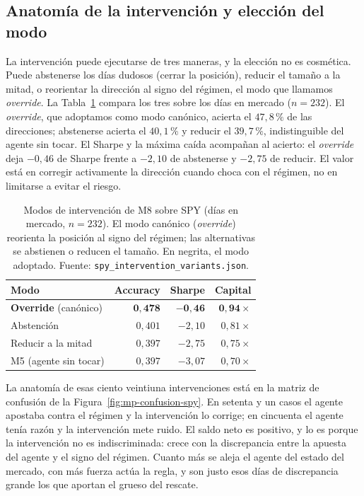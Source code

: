 \subsection{Anatomía de la intervención y elección del modo}
\label{sec:mp-spy-variantes}

La intervención puede ejecutarse de tres maneras, y la elección no es cosmética. Puede abstenerse los días dudosos (cerrar la posición), reducir el tamaño a la mitad, o reorientar la dirección al signo del régimen, el modo que llamamos \emph{override}. La Tabla~\ref{tab:mp-variantes} compara los tres sobre los días en mercado ($n = 232$). El \emph{override}, que adoptamos como modo canónico, acierta el $47{,}8\,\%$ de las direcciones; abstenerse acierta el $40{,}1\,\%$ y reducir el $39{,}7\,\%$, indistinguible del agente sin tocar. El Sharpe y la máxima caída acompañan al acierto: el \emph{override} deja $-0{,}46$ de Sharpe frente a $-2{,}10$ de abstenerse y $-2{,}75$ de reducir. El valor está en corregir activamente la dirección cuando choca con el régimen, no en limitarse a evitar el riesgo.

\begin{table}[htbp]
\centering
\caption{Modos de intervención de M8 sobre SPY (días en mercado, $n = 232$). El modo canónico (\emph{override}) reorienta la posición al signo del régimen; las alternativas se abstienen o reducen el tamaño. En negrita, el modo adoptado. Fuente: \texttt{spy\_intervention\_variants.json}.}
\label{tab:mp-variantes}
\begin{tabular}{lrrr}
\toprule
Modo & Accuracy & Sharpe & Capital \\
\midrule
\textbf{Override} (canónico) & $\mathbf{0{,}478}$ & $\mathbf{-0{,}46}$ & $\mathbf{0{,}94\times}$ \\
Abstención & $0{,}401$ & $-2{,}10$ & $0{,}81\times$ \\
Reducir a la mitad & $0{,}397$ & $-2{,}75$ & $0{,}75\times$ \\
M5 (agente sin tocar) & $0{,}397$ & $-3{,}07$ & $0{,}70\times$ \\
\bottomrule
\end{tabular}
\end{table}

La anatomía de esas ciento veintiuna intervenciones está en la matriz de confusión de la Figura~\ref{fig:mp-confusion-spy}. En setenta y un casos el agente apostaba contra el régimen y la intervención lo corrige; en cincuenta el agente tenía razón y la intervención mete ruido. El saldo neto es positivo, y lo es porque la intervención no es indiscriminada: crece con la discrepancia entre la apuesta del agente y el signo del régimen. Cuanto más se aleja el agente del estado del mercado, con más fuerza actúa la regla, y son justo esos días de discrepancia grande los que aportan el grueso del rescate.

